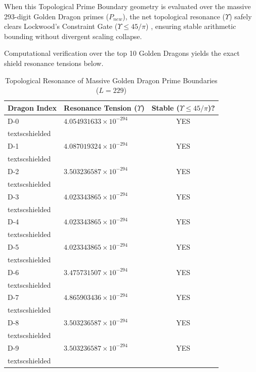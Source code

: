 \documentclass[12pt,oneside]{article}
\theoremstyle{principia}
\theoremstyle{definition}
\theoremstyle{remark}
\begin{document}
When this Topological Prime Boundary geometry is evaluated over the massive 293-digit Golden Dragon primes ($P_{new}$), the net topological resonance ($\Upsilon$) safely clears Lockwood's Constraint Gate ($\Upsilon \le 45/\pi$) \cite{lockwood_chrono}, ensuring stable arithmetic bounding without divergent scaling collapse.

Computational verification over the top 10 Golden Dragons yields the exact shield resonance tensions below.

\begin{table}[h]
\centering
\caption{Topological Resonance of Massive Golden Dragon Prime Boundaries ($L=229$)}
\label{tab:golden_bubble}
\begin{tabular}{@{}llc@{}}
\toprule
Dragon Index & Resonance Tension ($\Upsilon$) & Stable ($\Upsilon \le 45/\pi$)? \\
\midrule
D-0 & $4.054931633 \times 10^{-294}$ & YES \\textsc{shielded} \\
D-1 & $4.087019324 \times 10^{-294}$ & YES \\textsc{shielded} \\
D-2 & $3.503236587 \times 10^{-294}$ & YES \\textsc{shielded} \\
D-3 & $4.023343865 \times 10^{-294}$ & YES \\textsc{shielded} \\
D-4 & $4.023343865 \times 10^{-294}$ & YES \\textsc{shielded} \\
D-5 & $4.023343865 \times 10^{-294}$ & YES \\textsc{shielded} \\
D-6 & $3.475731507 \times 10^{-294}$ & YES \\textsc{shielded} \\
D-7 & $4.865903436 \times 10^{-294}$ & YES \\textsc{shielded} \\
D-8 & $3.503236587 \times 10^{-294}$ & YES \\textsc{shielded} \\
D-9 & $3.503236587 \times 10^{-294}$ & YES \\textsc{shielded} \\
\bottomrule
\end{tabular}
\end{table}
\end{document}
